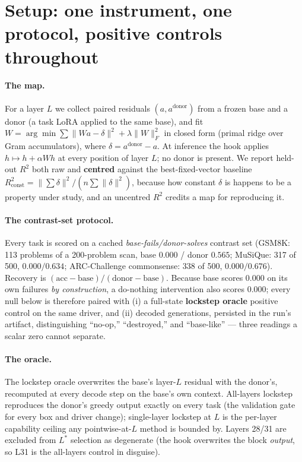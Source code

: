 \documentclass{article}
\begin{document}
\section{Setup: one instrument, one protocol, positive controls throughout}
\label{sec:setup}

\paragraph{The map.} For a layer $L$ we collect paired residuals $(a, a^{\mathrm{donor}})$ from a
frozen base and a donor (a task LoRA applied to the same base), and fit
$W = \arg\min \sum \lVert Wa - \delta \rVert^2 + \lambda\lVert W \rVert_F^2$ in closed form
(primal ridge over Gram accumulators), where $\delta = a^{\mathrm{donor}} - a$. At inference the
hook applies $h \mapsto h + \alpha W h$ at every position of layer $L$; no donor is present. We
report held-out $R^2$ both raw and \textbf{centred} against the best-fixed-vector baseline
$R^2_{\mathrm{const}} = \lVert\sum\delta\rVert^2 / (n\sum\lVert\delta\rVert^2)$, because how
constant $\delta$ is happens to be a property under study, and an uncentred $R^2$ credits a map for
reproducing it. %

\paragraph{The contrast-set protocol.} Every task is scored on a cached
\emph{base-fails/donor-solves} contrast set (GSM8K: 113 problems of a 200-problem scan, base
$0.000$ / donor $0.565$; MuSiQue: 317 of 500, $0.000/0.634$; ARC-Challenge commonsense: 338 of
500, $0.000/0.676$). Recovery is $(\mathrm{acc}-\mathrm{base})/(\mathrm{donor}-\mathrm{base})$.
Because base scores $0.000$ on its own failures \emph{by construction}, a do-nothing intervention
also scores $0.000$; every null below is therefore paired with (i) a full-state \textbf{lockstep
oracle} positive control on the same driver, and (ii) decoded generations, persisted in the run's
artifact, distinguishing ``no-op,'' ``destroyed,'' and ``base-like'' --- three readings a scalar
zero cannot separate.

\paragraph{The oracle.} The lockstep oracle overwrites the base's layer-$L$ residual with the
donor's, recomputed at every decode step on the base's own context. All-layers lockstep reproduces
the donor's greedy output exactly on every task (the validation gate for every box and driver
change); single-layer lockstep at $L$ is the per-layer capability ceiling any pointwise-at-$L$
method is bounded by. Layers 28/31 are excluded from $L^*$ selection as degenerate (the hook
overwrites the block \emph{output}, so L31 is the all-layers control in disguise).
\end{document}

